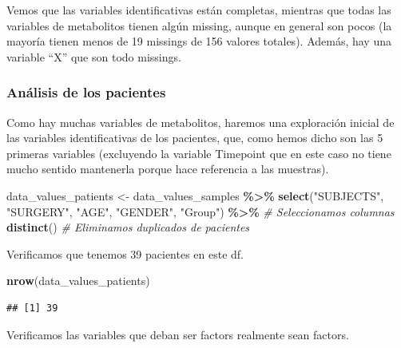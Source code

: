 \documentclass[
]{article}
\newenvironment{Shaded}{\begin{snugshade}}{\end{snugshade}}
\newcommand{\CommentTok}[1]{\textcolor[rgb]{0.56,0.35,0.01}{\textit{#1}}}
\newcommand{\FunctionTok}[1]{\textcolor[rgb]{0.13,0.29,0.53}{\textbf{#1}}}
\newcommand{\NormalTok}[1]{#1}
\newcommand{\OtherTok}[1]{\textcolor[rgb]{0.56,0.35,0.01}{#1}}
\newcommand{\SpecialCharTok}[1]{\textcolor[rgb]{0.81,0.36,0.00}{\textbf{#1}}}
\newcommand{\StringTok}[1]{\textcolor[rgb]{0.31,0.60,0.02}{#1}}
\begin{document}
Vemos que las variables identificativas están completas, mientras que
todas las variables de metabolitos tienen algún missing, aunque en
general son pocos (la mayoría tienen menos de 19 missings de 156 valores
totales). Además, hay una variable ``X'' que son todo missings.

\subsubsection{Análisis de los
pacientes}\label{anuxe1lisis-de-los-pacientes}

Como hay muchas variables de metabolitos, haremos una exploración
inicial de las variables identificativas de los pacientes, que, como
hemos dicho son las 5 primeras variables (excluyendo la variable
Timepoint que en este caso no tiene mucho sentido mantenerla porque hace
referencia a las muestras).

\begin{Shaded}
\begin{Highlighting}[]
\NormalTok{data\_values\_patients }\OtherTok{\textless{}{-}}\NormalTok{ data\_values\_samples }\SpecialCharTok{\%\textgreater{}\%} 
  \FunctionTok{select}\NormalTok{(}\StringTok{"SUBJECTS"}\NormalTok{, }\StringTok{"SURGERY"}\NormalTok{, }\StringTok{"AGE"}\NormalTok{, }\StringTok{"GENDER"}\NormalTok{, }\StringTok{"Group"}\NormalTok{) }\SpecialCharTok{\%\textgreater{}\%} \CommentTok{\# Seleccionamos columnas}
  \FunctionTok{distinct}\NormalTok{() }\CommentTok{\# Eliminamos duplicados de pacientes}
\end{Highlighting}
\end{Shaded}

Verificamos que tenemos 39 pacientes en este df.

\begin{Shaded}
\begin{Highlighting}[]
\FunctionTok{nrow}\NormalTok{(data\_values\_patients)}
\end{Highlighting}
\end{Shaded}

\begin{verbatim}
## [1] 39
\end{verbatim}

Verificamos las variables que deban ser factors realmente sean factors.

\begin{Shaded}
\end{Shaded}
\end{document}
